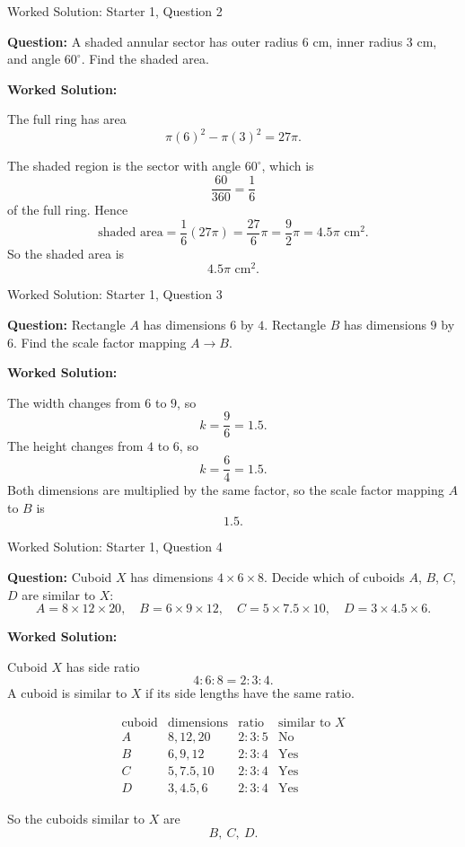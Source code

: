 \documentclass{beamer}
\begin{document}
\begin{frame}{Worked Solution: Starter 1, Question 2}

\textbf{Question:} A shaded annular sector has outer radius \(6\) cm, inner radius \(3\) cm, and angle \(60^\circ\). Find the shaded area.

\textbf{Worked Solution:}

The full ring has area
\[
\pi(6)^2-\pi(3)^2=27\pi.
\]

The shaded region is the sector with angle \(60^\circ\), which is
\[
\frac{60}{360}=\frac16
\]
of the full ring. Hence
\[
\text{shaded area}
=\frac16(27\pi)
=\frac{27}{6}\pi
=\frac{9}{2}\pi
=4.5\pi\text{ cm}^2.
\]
So the shaded area is
\[
\boxed{4.5\pi\text{ cm}^2}.
\]

\end{frame}

\begin{frame}{Worked Solution: Starter 1, Question 3}

\textbf{Question:} Rectangle \(A\) has dimensions \(6\) by \(4\). Rectangle \(B\) has dimensions \(9\) by \(6\). Find the scale factor mapping \(A\to B\).

\textbf{Worked Solution:}

The width changes from \(6\) to \(9\), so
\[
k=\frac{9}{6}=1.5.
\]
The height changes from \(4\) to \(6\), so
\[
k=\frac{6}{4}=1.5.
\]
Both dimensions are multiplied by the same factor, so the scale factor mapping \(A\) to \(B\) is
\[
\boxed{1.5}.
\]

\end{frame}

\begin{frame}{Worked Solution: Starter 1, Question 4}

\textbf{Question:} Cuboid \(X\) has dimensions \(4\times6\times8\). Decide which of cuboids \(A\), \(B\), \(C\), \(D\) are similar to \(X\):
\[
A=8\times12\times20,\quad B=6\times9\times12,\quad C=5\times7.5\times10,\quad D=3\times4.5\times6.
\]

\textbf{Worked Solution:}

Cuboid \(X\) has side ratio
\[
4:6:8=2:3:4.
\]
A cuboid is similar to \(X\) if its side lengths have the same ratio.

\[
\begin{array}{c|c|c|c}
\text{cuboid} & \text{dimensions} & \text{ratio} & \text{similar to }X\\ \hline
A & 8,12,20 & 2:3:5 & \text{No}\\
B & 6,9,12 & 2:3:4 & \text{Yes}\\
C & 5,7.5,10 & 2:3:4 & \text{Yes}\\
D & 3,4.5,6 & 2:3:4 & \text{Yes}
\end{array}
\]

So the cuboids similar to \(X\) are
\[
\boxed{B,\ C,\ D}.
\]

\end{frame}
\end{document}
